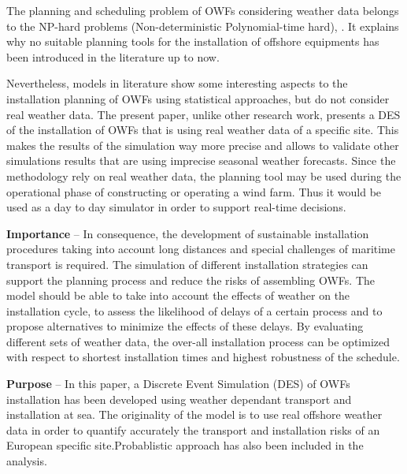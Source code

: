The planning and scheduling problem of OWFs considering weather data belongs to the NP-hard problems (Non-deterministic Polynomial-time hard), \cite{leeuwen1990}. It explains why no suitable planning tools for the installation of offshore equipments has been introduced in the literature up to now. 

Nevertheless, models in literature show some interesting aspects to the installation planning of OWFs using statistical approaches, but do not consider real weather data. The present paper, unlike other research work, presents a DES of the installation of OWFs that is using real weather data of a specific site. This makes the results of the simulation way more precise and allows to validate other simulations results that are using imprecise seasonal weather forecasts. Since the methodology rely on real weather data, the planning tool may be used during the operational phase of constructing or operating a wind farm. Thus it would be used as a day to day simulator in order to support real-time decisions.

\textbf{Importance} --
In consequence, the development of sustainable installation procedures taking into account long distances and special challenges of maritime transport is required. The simulation of different installation strategies can support the planning process and reduce the risks of assembling OWFs. The model should be able to take into account the effects of weather on the installation cycle, to assess the likelihood of delays of a certain process and to propose alternatives to minimize the effects of these delays. By evaluating different sets of weather data, the over-all installation process can be optimized with respect to shortest installation times and highest robustness of the schedule.

\textbf{Purpose} --
In this paper, a Discrete Event Simulation (DES) of OWFs installation has been developed using weather dependant transport and installation at sea. The originality of the model is to use real offshore weather data in order to quantify accurately the transport and installation risks of an European specific site.Probablistic approach has also been included in the analysis.



